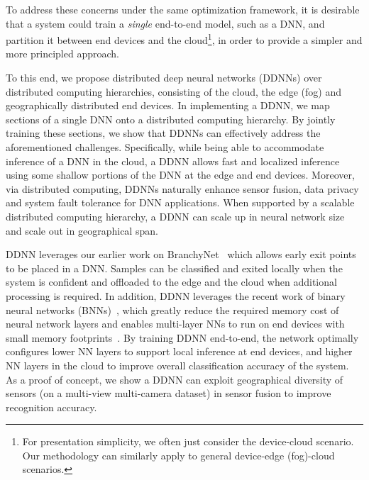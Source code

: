 \documentclass[10pt, conference, compsocconf]{IEEEtran}
\begin{document}
\begin{itemize}
     
    
\end{itemize}

To address these concerns under the same optimization framework, it is desirable that a system could train a \textit{single} end-to-end model, such as a DNN, and partition it between end devices and the cloud\footnote{For presentation simplicity, we often just consider the device-cloud scenario. Our methodology can similarly apply to general device-edge (fog)-cloud scenarios.}, in order to provide a simpler and more principled approach.

To this end, we propose distributed deep neural networks (DDNNs) over distributed computing hierarchies, consisting of the cloud, the edge (fog) and geographically distributed end devices. In implementing a DDNN, we map sections of a single DNN onto a distributed computing hierarchy. By jointly training these sections, we show that DDNNs can effectively address the aforementioned challenges. Specifically, while being able to accommodate inference of a DNN in the cloud, a DDNN allows fast and localized inference using some shallow portions of the DNN at the edge and end devices. Moreover, via distributed computing, DDNNs naturally enhance sensor fusion, data privacy and system fault tolerance for DNN applications. When supported by a scalable distributed computing hierarchy, a DDNN can scale up in neural network size and scale out in geographical span. 

DDNN leverages our earlier work on BranchyNet~\cite{teerapittayanon2016branchynet} which allows early exit points to be placed in a DNN. Samples can be classified and exited locally when the system is confident and offloaded to the edge and the cloud when additional processing is required. In addition, DDNN leverages the recent work of binary neural networks (BNNs)~\cite{courbariaux2015binaryconnect}, which greatly reduce the required memory cost of neural network layers and enables multi-layer NNs to run on end devices with small memory footprints~\cite{mcdanel2016ebnn}.   By training DDNN end-to-end, the network optimally configures lower NN layers to support local inference at end devices, and higher NN layers in the cloud to improve overall classification accuracy of the system. As a proof of concept, we show a DDNN can exploit geographical diversity of sensors (on a multi-view multi-camera dataset) in sensor fusion to improve recognition accuracy. 
\end{document}
